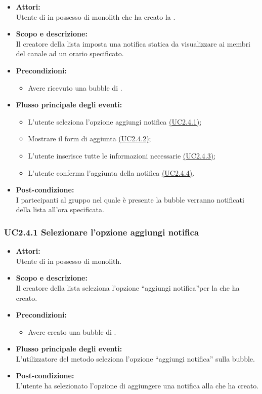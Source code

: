 \begin{itemize}
	\item \textbf{Attori:}
	\\Utente di  in possesso di monolith che ha creato la .
	\item \textbf{Scopo e descrizione:} 
	\\Il creatore della lista imposta una notifica statica da visualizzare ai membri del canale ad un orario specificato.
	\item \textbf{Precondizioni:}
	\begin{itemize}
		\item Avere ricevuto una bubble di .
	\end{itemize}
	\item \textbf{Flusso principale degli eventi:}
	\begin{itemize}
		\item L’utente seleziona l’opzione aggiungi notifica \hyperref[UC2.4.1]{(UC2.4.1)};
		\item Mostrare il form di aggiunta \hyperref[UC2.4.2]{(UC2.4.2)};
		\item L’utente inserisce tutte le informazioni necessarie \hyperref[UC2.4.3]{(UC2.4.3)};
		\item L’utente conferma l’aggiunta della notifica \hyperref[UC2.4.4]{(UC2.4.4)}.
	\end{itemize}
	\item \textbf{Post-condizione:}
	\\I partecipanti al gruppo nel quale è presente la bubble verranno notificati della lista all'ora specificata.
\end{itemize}

\subsubsection{UC2.4.1 Selezionare l’opzione aggiungi notifica} \label{UC2.4.1}

\begin{itemize}
	\item \textbf{Attori:}
	\\Utente di  in possesso di monolith.
	\item \textbf{Scopo e descrizione:} 
	\\Il creatore della lista seleziona l’opzione “aggiungi notifica”per la  che ha creato.
	\item \textbf{Precondizioni:}
	\begin{itemize}
		\item Avere creato una bubble di .
	\end{itemize}
	\item \textbf{Flusso principale degli eventi:}
	\\L’utilizzatore del metodo seleziona l’opzione “aggiungi notifica” sulla bubble.
	\item \textbf{Post-condizione:}
	\\L’utente ha selezionato l’opzione di aggiungere una notifica alla  che ha creato.
\end{itemize}

